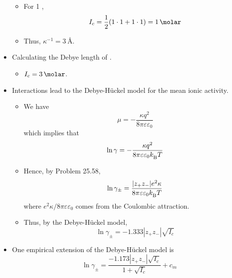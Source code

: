 \documentclass[../notes.tex]{subfiles}
\begin{document}
\begin{itemize}
\begin{itemize}
        \item For \SI{1}{\molar} ,
        \begin{equation*}
            I_c = \frac{1}{2}(1\cdot 1+1\cdot 1) = \SI{1}{\molar}
        \end{equation*}
        \item Thus, $\kappa^{-1}=\SI{3}{\angstrom}$.
    \end{itemize}
    \item Calculating the Debye length of .
    \begin{itemize}
        \item $I_c=\SI{3}{\molar}$.
    \end{itemize}
    \item Interactions lead to the Debye-H\"{u}ckel model for the mean ionic activity.
    \begin{itemize}
        \item We have
        \begin{equation*}
            \mu = -\frac{\kappa q^2}{8\pi\varepsilon\varepsilon_0}
        \end{equation*}
        which implies that
        \begin{equation*}
            \ln\gamma = -\frac{\kappa q^2}{8\pi\varepsilon\varepsilon_0{k_\text{B}^{}} T}
        \end{equation*}
        \item Hence, by Problem 25.58,
        \begin{equation*}
            \ln\gamma_\pm = \frac{|z_+z_-|e^2\kappa}{8\pi\varepsilon\varepsilon_0{k_\text{B}^{}} T}
        \end{equation*}
        where $e^2\kappa/8\pi\varepsilon\varepsilon_0$ comes from the Coulombic attraction.
        \item Thus, by the Debye-H\"{u}ckel model,
        \begin{equation*}
            \ln\gamma_\pm = -1.333|z_+z_-|\sqrt{I_c}
        \end{equation*}
    \end{itemize}
    \item One empirical extension of the Debye-H\"{u}ckel model is
    \begin{equation*}
        \ln\gamma_\pm = \frac{-1.173|z_+z_-|\sqrt{I_c}}{1+\sqrt{I_c}}+c_m
    \end{equation*}
\end{itemize}
\end{document}
